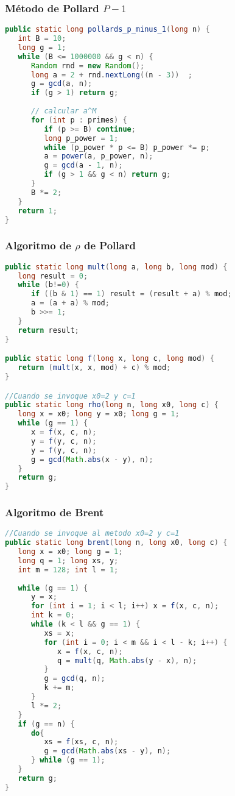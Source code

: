 \subsubsection{Método de Pollard $P-1$}
\begin{lstlisting}[language=Java]
public static long pollards_p_minus_1(long n) {
   int B = 10;
   long g = 1;
   while (B <= 1000000 && g < n) {
      Random rnd = new Random(); 
      long a = 2 + rnd.nextLong((n - 3))  ;
      g = gcd(a, n);
      if (g > 1) return g;
		
      // calcular a^M
      for (int p : primes) {
         if (p >= B) continue;
         long p_power = 1;
         while (p_power * p <= B) p_power *= p;
         a = power(a, p_power, n);
         g = gcd(a - 1, n);
         if (g > 1 && g < n) return g;
      }
      B *= 2;
   }
   return 1;
}
\end{lstlisting}


\subsubsection{Algoritmo de $\rho$ de Pollard}
\begin{lstlisting}[language=Java]
public static long mult(long a, long b, long mod) {
   long result = 0;
   while (b!=0) {
      if ((b & 1) == 1) result = (result + a) % mod;
      a = (a + a) % mod;
      b >>= 1;
   }
   return result;
}

public static long f(long x, long c, long mod) {
   return (mult(x, x, mod) + c) % mod;
}

//Cuando se invoque x0=2 y c=1
public static long rho(long n, long x0, long c) {
   long x = x0; long y = x0; long g = 1;
   while (g == 1) {
      x = f(x, c, n);
      y = f(y, c, n);
      y = f(y, c, n);
      g = gcd(Math.abs(x - y), n);
   }
   return g;
}
\end{lstlisting}


\subsubsection{Algoritmo de Brent}
\begin{lstlisting}[language=Java]
//Cuando se invoque al metodo x0=2 y c=1
public static long brent(long n, long x0, long c) {
   long x = x0; long g = 1;
   long q = 1; long xs, y;
   int m = 128; int l = 1;
   
   while (g == 1) {
      y = x;
      for (int i = 1; i < l; i++) x = f(x, c, n);
      int k = 0;
      while (k < l && g == 1) {
         xs = x;
         for (int i = 0; i < m && i < l - k; i++) {
            x = f(x, c, n);
            q = mult(q, Math.abs(y - x), n);
         }
         g = gcd(q, n);
         k += m;
      }
      l *= 2;
   }
   if (g == n) {
      do{
         xs = f(xs, c, n);
         g = gcd(Math.abs(xs - y), n);
      } while (g == 1);
   }
   return g;
}
\end{lstlisting}